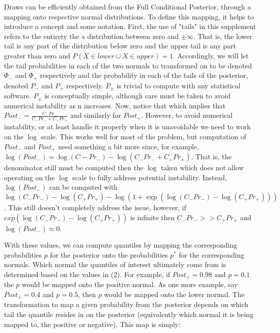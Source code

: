 Draws can be efficiently obtained from the Full Conditional Posterior,
 through a mapping onto respective normal distributions. To define this mapping, it helps to introduce a concept and some notation. First, the use of "tails" in this supplement refers to the entirety the a distribution between zero and $\pm \infty$. That is, the lower tail is any part of the distribution below zero and the upper tail is any part greater than zero and $P(X \in lower \cup X \in upper) = 1$. Accordingly, we will let the tail probabilities in each of the two normals to transformed on to be denoted $\Phi_{-}$ and $\Phi_{+}$ respectively and the probability in each of the tails of the posterior, denoted $P_{-}$ and $P_{+}$ respectively. $P_{\pm}$ is trivial to compute with any statistical software. $P_{\pm}$ is conceptually simple, although care must be taken to avoid numerical instability as n increases. Now, notice that
 which implies that $Post_- = \frac{C_{-} Pr_{-}}{C_{-} Pr_{-} + C_{+} Pr_{+}}$ and similarly for $Post_+$. However, to avoid numerical instability, or at least handle it properly when it is unavoidable we need to work on the $\log$ scale. This works well for most of the problem, but computation of $Post_-$ and $Post_+$ need something a bit more since, for example, $\log(Post_-) = \log(C{-}Pr_{-}) - \log(C_{-} Pr_{-} + C_{+} Pr_{+})$. That is, the denominator still must be computed then the $\log$ taken which does not allow operating on the $\log$ scale to fully address potential instability. Instead, $\log(Post_-)$ can be computed with $\log(C_-Pr_-) -  \log(C_+Pr_+) - \log(1 + \exp(\log(C_-Pr_-) -  \log(C_+Pr_+)))$. This still doesn't completely address the issue, however, if $exp(\log(C_-Pr_-) -  \log(C_+Pr_+))$ is infinite then $C_-Pr_- >> C_+Pr_+$ and $\log(Post_-) \approx 0$.

With these values, we can compute quantiles by mapping the corresponding probabilities $p$ for the posterior onto the probabilities $p^*$ for the corresponding normals. Which normal the quantiles of interest ultimately come from is determined based on the values in (2). For example, if $Post_{+} = 0.98$ and $p = 0.1$ the $p$ would be mapped onto the positive normal. As one more example, say $Post_{+} = 0.4$ and $p = 0.5$, then $p$ would be mapped onto the lower normal. The transformation to map a given probability from the posterior depends on which tail the quantile resides in on the posterior (equivalently which normal it is being mapped to, the positive or negative). This map is simply:

